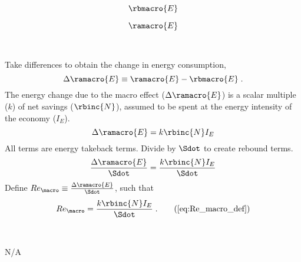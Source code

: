 

\begin{landscape}

\linespread{1}


\sectionsep{}

{
\begin{equation}
  \rbmacro{E}
\end{equation}
}
{
}

\sectionsep{}

{
\begin{equation}
\ramacro{E}
\end{equation}
}
{
}

\sectionsep{}

\derivsection{}
{
~

Take differences to obtain the change in energy consumption,
%
\begin{equation}
  \Delta \ramacro{E} \equiv \ramacro{E} - \rbmacro{E} \; .
\end{equation}
%
The energy change due to the macro effect ($\Delta \ramacro{E}$) 
is a scalar multiple ($k$) of net savings ($\rbinc{N}$), 
assumed to be spent at the energy intensity of the economy ($I_E$).
%
\begin{equation}
  \Delta \ramacro{E} = k \rbinc{N} I_E
\end{equation}
%
All terms are energy takeback terms.
Divide by $\Sdot$
to create rebound terms.
%
\begin{equation}
  \frac{\Delta \ramacro{E}}{\Sdot} = \frac{k \rbinc{N} I_E}{\Sdot}
\end{equation}
%
Define 
$Re_{\macro} \equiv \frac{\Delta \ramacro{E}}{\Sdot}$, 
such that
%
\begin{equation}
  Re_{\macro} = \frac{k \rbinc{N} I_E}{\Sdot} \; . \tag{\ref{eq:Re_macro_def}}
\end{equation}
%
}
{
~
\centering

N/A
}
\end{landscape}
